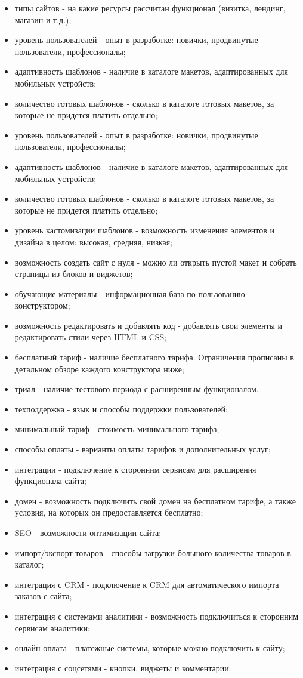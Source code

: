 \begin{itemize}
  \item типы сайтов - на какие ресурсы рассчитан функционал (визитка, лендинг, магазин и т.д.);
  \item уровень пользователей - опыт в разработке: новички, продвинутые пользователи, профессионалы;
  \item адаптивность шаблонов - наличие в каталоге макетов, адаптированных для мобильных устройств;
  \item количество готовых шаблонов - сколько в каталоге готовых макетов, за которые не придется платить отдельно;
  \item уровень пользователей - опыт в разработке: новички, продвинутые пользователи, профессионалы;
  \item адаптивность шаблонов - наличие в каталоге макетов, адаптированных для мобильных устройств;
  \item количество готовых шаблонов - сколько в каталоге готовых макетов, за которые не придется платить отдельно;
  \item уровень кастомизации шаблонов - возможность изменения элементов и дизайна в целом: высокая, средняя, низкая;
  \item возможность создать сайт с нуля - можно ли открыть пустой макет и собрать страницы из блоков и виджетов;
  \item обучающие материалы - информационная база по пользованию конструктором;
  \item возможность редактировать и добавлять код - добавлять свои элементы и редактировать стили через HTML и CSS;
  \item бесплатный тариф - наличие бесплатного тарифа. Ограничения прописаны в детальном обзоре каждого конструктора ниже;
  \item триал - наличие тестового периода с расширенным функционалом.
  \item техподдержка - язык и способы поддержки пользователей;
  \item минимальный тариф - стоимость минимального тарифа;
  \item способы оплаты - варианты оплаты тарифов и дополнительных услуг;
  \item интеграции - подключение к сторонним сервисам для расширения функционала сайта;
  \item домен - возможность подключить свой домен на бесплатном тарифе, а также условия, на которых он предоставляется бесплатно;
  \item SEO - возможности оптимизации сайта;
  \item импорт/экспорт товаров - способы загрузки большого количества товаров в каталог;
  \item интеграция с CRM - подключение к CRM для автоматического импорта заказов с сайта;
  \item интеграция с системами аналитики - возможность подключиться к сторонним сервисам аналитики;
  \item онлайн-оплата - платежные системы, которые можно подключить к сайту;
  \item интеграция с соцсетями - кнопки, виджеты и комментарии.
\end{itemize}

